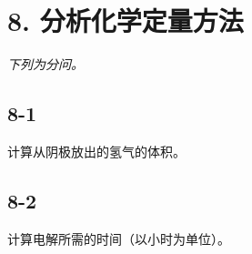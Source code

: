 \section*{8. 分析化学定量方法}
\textit{下列为分问。}

\subsection*{8-1}
计算从阴极放出的氢⽓的体积。

\subsection*{8-2}
计算电解所需的时间（以⼩时为单位）。
